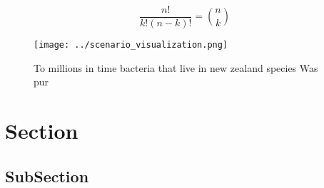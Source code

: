\documentclass[a4paper]{article}
\begin{document}
\[ \frac{n!}{k!(n-k)!} = \binom{n}{k} \]

\begin{figure}
\centering
\texttt{[image: ../scenario\_visualization.png]}
\caption{To millions in time bacteria that live in new zealand species Was pur
}
\end{figure}
 
\section{Section}

\subsection{SubSection}
\end{document}
